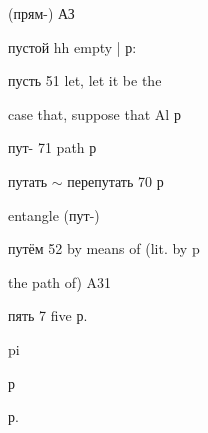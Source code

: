 \begin{minipage}[t]{0.475\textwidth}
\noindent (прям-) АЗ\par
\noindent пустой hh empty | р:\par
\noindent пусть 51 let, let it be the\par
\noindent case that, suppose that Al р\par
\noindent пут- 71 path р\par
\noindent путать $\sim$ перепутать 70 р\par
\noindent entangle (пут-)\par
\noindent путём 52 by means of (lit. by p\par
\noindent the path of) A31\par
\noindent пять 7 five р.\par
\noindent pi\par
\noindent р\par
\noindent р.\par
\end{minipage}\hfill
